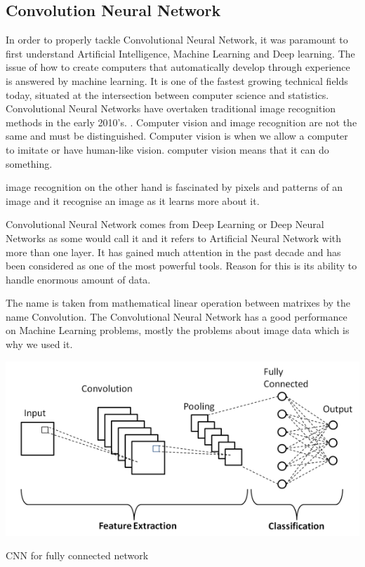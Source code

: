\subsection{Convolution Neural Network}
In order to properly tackle Convolutional Neural Network, it was paramount to first understand Artificial Intelligence, Machine Learning and Deep learning.
The issue of how to create computers that automatically develop through experience is answered by machine learning. It is one of the fastest growing technical fields today, situated at the intersection between computer science and statistics.\cite{jordan2015machine}
Convolutional Neural Networks have overtaken traditional image recognition methods in the early 2010's. \vspace{5mm}.
Computer vision and image recognition are not the same and must be distinguished. Computer vision is when we allow a computer to imitate or have human-like vision. computer vision means that it can do something. 

image recognition on the other hand is fascinated by pixels and patterns of an image and it recognise an image as it learns more about it.


Convolutional Neural Network comes from Deep Learning or Deep Neural Networks as some would call it and it refers to
Artificial Neural Network with more than one layer. It has gained much attention in the past decade and has been considered as one of the most powerful tools.
Reason for this is its ability to handle enormous amount of data. \cite{albawi2017understanding}

The name is taken from mathematical linear operation between matrixes by the name Convolution. The Convolutional Neural Network
has a good performance on Machine Learning problems, mostly the problems about image data which is why we used it. 




    \centerline{\includegraphics[width=.5\textwidth,height=.7\textheight,keepaspectratio]{tex/images/cnn.jpg}}
    \caption{CNN for fully connected network}
    \label{fig:my_label}
  





